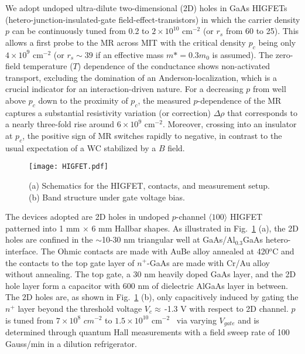 \documentclass[twocolumn,secnumarabic,amssymb, nobibnotes, aps, prd]{revtex4-1}
\begin{document}
We adopt undoped ultra-dilute two-dimensional (2D) holes in GaAs HIGFETs (hetero-junction-insulated-gate field-effect-transistors) in which the carrier density $p$ can be continuously tuned from 0.2 to $2\times10^{10}$ cm$^{-2}$ (or $r_s$ from 60 to 25). This allows a first probe to the MR across MIT with the critical density $p_c$ being only $4\times10^{9}$ cm$^{-2}$ (or $r_s\sim 39$ if an effective mass $m*=0.3m_0$ is assumed). The zero-field temperature ($T$) dependence of the conductance shows non-activated transport, excluding the domination of an Anderson-localization, which is a crucial indicator for an interaction-driven nature. For a decreasing $p$ from well above $p_c$ down to the proximity of $p_c$, the measured $p$-dependence of the MR captures a substantial resistivity variation (or correction) $\Delta\rho$ that corresponds to a nearly three-fold rise around $6\times10^{9}$ cm$^{-2}$. Moreover, crossing into an insulator at $p_c$, the positive sign of MR switches rapidly to negative, in contrast to the usual expectation of a WC stabilized by a $B$ field.  
\begin{figure}[t]
 \centering
 \texttt{[image: HIGFET.pdf]}
 \caption{\label{fig:device} (a) Schematics for the HIGFET, contacts, and measurement setup. (b) Band structure under gate voltage bias.}
\end{figure}

The devices adopted are 2D holes in undoped $p$-channel $\langle100\rangle$ HIGFET~\cite{kane,noh,jian06} patterned into 1 mm $\times$ 6 mm Hallbar shapes. As illustrated in Fig.~\ref{fig:device} (a), the 2D holes are confined in the $\sim$10-30 nm triangular well at GaAs/Al$_{0.3}$GaAs hetero-interface. The Ohmic contacts are made with AuBe alloy annealed at 420$^o$C and the contacts to the top gate layer of $n^+$-GaAs are made with Cr/Au alloy without annealing. The top gate, a 30 nm heavily doped GaAs layer, and the 2D hole layer form a capacitor with 600 nm of dielectric AlGaAs layer in between. The 2D holes are, as shown in Fig.~\ref{fig:device} (b), only capacitively induced by gating the $n^+$ layer beyond the threshold voltage $V_c\approx$\,-1.3 V with respect to 2D channel. $p$ is tuned from $7\times10^{8}$ $cm^{-2}$ to $1.5\times10^{10}$ cm$^{-2}$~\cite{jian06} via varying $V_{gate}$ and is determined through quantum Hall measurements with a field sweep rate of 100 Gauss/min in a dilution refrigerator. %
\end{document}
